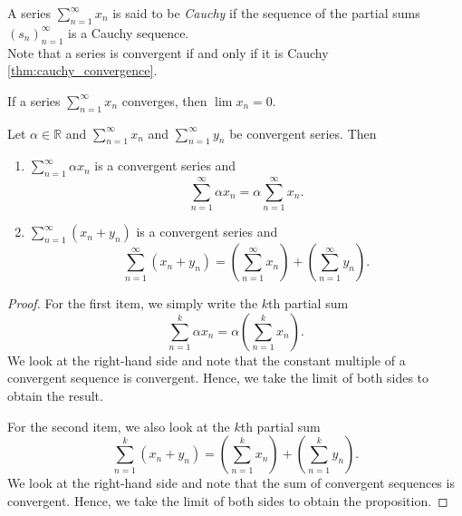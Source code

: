 \documentclass[../main.tex]{subfiles}
\begin{document}
    
    \begin{definition}
    A series $\sum_{n=1}^\infty{x_n}$ is said to be \textit{Cauchy} if the sequence of the partial sums $ (s_n)^\infty_{n=1}$ is a Cauchy sequence.\\
    Note that a series is convergent if and only if it is Cauchy \ref{thm:cauchy_convergence}.
    \end{definition}
    
    
    
    
    \begin{exercise}
    If a series $\sum_{n=1}^\infty{x_n}$ converges, then $\lim{x_n} = 0.$
    \end{exercise}
    
    
    
    
    
    
    \begin{proposition}\label{prp:linearity_series}
    Let $\alpha \in \mathbb{R}$ and $\sum_{n=1}^{\infty} x_n$ and $\sum_{n=1}^{\infty} y_n$ be convergent series. Then
    \begin{enumerate}
        \item $\sum_{n=1}^{\infty} \alpha x_n$ is a convergent series and
        \[
        \sum_{n=1}^{\infty} \alpha x_n = \alpha \sum_{n=1}^{\infty} x_n.
        \]
        \item $\sum_{n=1}^{\infty} (x_n + y_n)$ is a convergent series and
        \[
        \sum_{n=1}^{\infty} (x_n + y_n) = \left( \sum_{n=1}^{\infty} x_n \right) + \left( \sum_{n=1}^{\infty} y_n \right).
        \]
    \end{enumerate}
    
    \end{proposition}
    
    \begin{proof}
        
    For the first item, we simply write the $k$th partial sum
    \[
    \sum_{n=1}^{k} \alpha x_n = \alpha \left( \sum_{n=1}^{k} x_n \right).
    \]
    We look at the right-hand side and note that the constant multiple of a convergent sequence is convergent. Hence, we take the limit of both sides to obtain the result.
    
    For the second item, we also look at the $k$th partial sum
    \[
    \sum_{n=1}^{k} (x_n + y_n) = \left( \sum_{n=1}^{k} x_n \right) + \left( \sum_{n=1}^{k} y_n \right).
    \]
    We look at the right-hand side and note that the sum of convergent sequences is convergent. Hence, we take the limit of both sides to obtain the proposition.   
    \end{proof}
    
\end{document}
